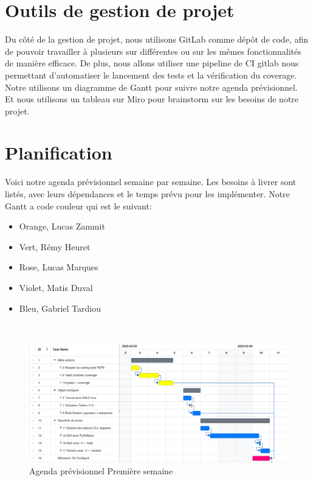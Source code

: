 \documentclass[a4paper,12pt]{article}
\begin{document}
\newpage
\section{Outils de gestion de projet}

Du côté de la gestion de projet, nous utilisons GitLab comme dépôt de code,
afin de pouvoir travailler à plusieurs sur différentes ou sur les mêmes
fonctionnalités de manière efficace. De plus, nous allons utiliser une pipeline
de CI gitlab nous permettant d'automatiser le lancement des tests et la
vérification du coverage.\\ Notre utilisons un diagramme de Gantt pour suivre
notre agenda prévisionnel.\\ Et nous utilisons un tableau sur Miro pour
brainstorm sur les besoins de notre projet.\\

\section{Planification}
Voici notre agenda prévisionnel semaine par semaine. Les besoins à livrer sont
listés, avec leurs dépendances et le temps prévu pour les implémenter. Notre
Gantt a code couleur qui est le suivant:
\begin{itemize}
  \item Orange, Lucas Zammit
  \item Vert, Rémy Heuret
  \item Rose, Lucas Marques
  \item Violet, Matis Duval
  \item Bleu, Gabriel Tardiou
\end{itemize}

\\

\begin{figure}[H]
  \centering
  \includegraphics[width=18cm]{images/Semaine1.png}
  \caption{Agenda prévisionnel Première semaine}
\end{figure}
\end{document}
